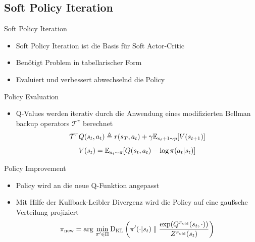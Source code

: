 \subsection{Soft Policy Iteration}
\begin{frame}{Soft Policy Iteration}
	\begin{itemize}
		\item Soft Policy Iteration ist die Basis für Soft Actor-Critic
		\item Benötigt Problem in tabellarischer Form
		\item Evaluiert und verbessert abwechselnd die Policy
	\end{itemize} 
\end{frame}

\begin{frame}{Policy Evaluation}
	\begin{itemize}
		\item Q-Values werden iterativ durch die Anwendung eines modifizierten Bellman backup operators $\mathcal{T}^\pi$ berechnet
		\begin{equation}
			\mathcal{T}^\pi \mathnormal{Q}(s_t,a_t) \triangleq \mathnormal{r}(s_T, a_t) + \gamma \mathbb{E}_{s_t+1\sim \mathnormal{p}}[\mathnormal{V}(s_{t+1})] \notag
		\end{equation}
		\begin{equation}
			\mathnormal{V}(s_{t}) = \mathbb{E}_{a_t \sim \pi}[\mathnormal{Q}(s_t, a_t) - \mathrm{log} \, \pi (a_t|s_t)] \notag
		\end{equation}
	\end{itemize}
\end{frame}

\begin{frame}{Policy Improvement}
	\begin{itemize}
		\item Policy wird an die neue Q-Funktion angepasst
		\item Mit Hilfe der Kullback-Leibler Divergenz wird die Policy auf eine gaußsche Verteilung projiziert
		\begin{equation}
			\pi_{\mathrm{new}} = \mathrm{arg} \, \min_{\pi^\prime \in \Pi} \mathrm{D_{KL}} \left( \pi^\prime(\cdot | s_t) \parallel \frac{\mathrm{exp} (\mathnormal{Q}^{\pi_{\mathrm{old}}}(s_t, \cdot))}{\mathnormal{Z}^{\pi_{\mathrm{old}}}(s_t)} \right) \notag
		\end{equation}
	\end{itemize} 
\end{frame}
